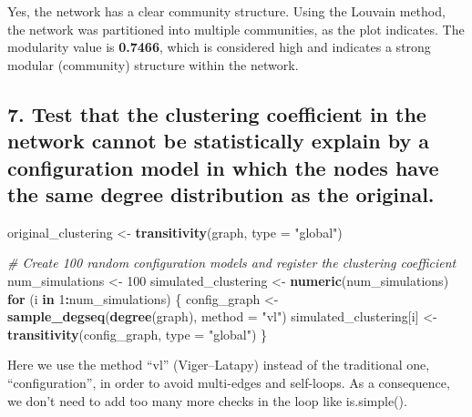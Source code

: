 \documentclass[
]{article}
\newenvironment{Shaded}{\begin{snugshade}}{\end{snugshade}}
\newcommand{\AttributeTok}[1]{\textcolor[rgb]{0.13,0.29,0.53}{#1}}
\newcommand{\CommentTok}[1]{\textcolor[rgb]{0.56,0.35,0.01}{\textit{#1}}}
\newcommand{\ControlFlowTok}[1]{\textcolor[rgb]{0.13,0.29,0.53}{\textbf{#1}}}
\newcommand{\DecValTok}[1]{\textcolor[rgb]{0.00,0.00,0.81}{#1}}
\newcommand{\FunctionTok}[1]{\textcolor[rgb]{0.13,0.29,0.53}{\textbf{#1}}}
\newcommand{\NormalTok}[1]{#1}
\newcommand{\OtherTok}[1]{\textcolor[rgb]{0.56,0.35,0.01}{#1}}
\newcommand{\SpecialCharTok}[1]{\textcolor[rgb]{0.81,0.36,0.00}{\textbf{#1}}}
\newcommand{\StringTok}[1]{\textcolor[rgb]{0.31,0.60,0.02}{#1}}
\begin{document}
Yes, the network has a clear community structure. Using the Louvain
method, the network was partitioned into multiple communities, as the
plot indicates. The modularity value is \textbf{0.7466}, which is
considered high and indicates a strong modular (community) structure
within the network.

\subsection{7. Test that the clustering coefficient in the network
cannot be statistically explain by a configuration model in which the
nodes have the same degree distribution as the
original.}\label{test-that-the-clustering-coefficient-in-the-network-cannot-be-statistically-explain-by-a-configuration-model-in-which-the-nodes-have-the-same-degree-distribution-as-the-original.}

\begin{Shaded}
\begin{Highlighting}[]
\NormalTok{original\_clustering }\OtherTok{\textless{}{-}} \FunctionTok{transitivity}\NormalTok{(graph, }\AttributeTok{type =} \StringTok{"global"}\NormalTok{)}
\end{Highlighting}
\end{Shaded}

\begin{Shaded}
\begin{Highlighting}[]
\CommentTok{\# Create 100 random configuration models and register the clustering coefficient}
\NormalTok{num\_simulations }\OtherTok{\textless{}{-}} \DecValTok{100}
\NormalTok{simulated\_clustering }\OtherTok{\textless{}{-}} \FunctionTok{numeric}\NormalTok{(num\_simulations)}
\ControlFlowTok{for}\NormalTok{ (i }\ControlFlowTok{in} \DecValTok{1}\SpecialCharTok{:}\NormalTok{num\_simulations) \{}
\NormalTok{  config\_graph }\OtherTok{\textless{}{-}} \FunctionTok{sample\_degseq}\NormalTok{(}\FunctionTok{degree}\NormalTok{(graph), }\AttributeTok{method =} \StringTok{"vl"}\NormalTok{)  }
\NormalTok{  simulated\_clustering[i] }\OtherTok{\textless{}{-}} \FunctionTok{transitivity}\NormalTok{(config\_graph, }\AttributeTok{type =} \StringTok{"global"}\NormalTok{)}
\NormalTok{\}}
\end{Highlighting}
\end{Shaded}

Here we use the method ``vl'' (Viger--Latapy) instead of the traditional
one, ``configuration'', in order to avoid multi-edges and self-loops. As
a consequence, we don't need to add too many more checks in the loop
like is.simple().
\end{document}
